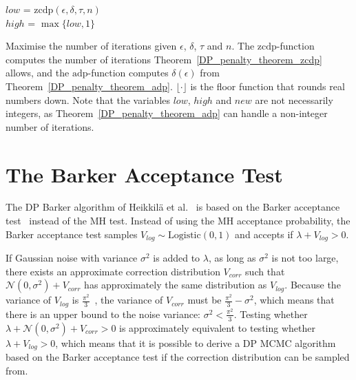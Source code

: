 \documentclass[english,twoside,openright]{HYgraduMLDS}
\newcommand{\caln}{{\mathcal{N}}}
\begin{document}
\begin{algorithm}[H]\label{max_iterations_algo}
  \SetAlgoLined
	\(low\) = \(\mathrm{zcdp}(\epsilon, \delta, \tau, n)\) \\
  \(high\) = \(\max \{low, 1\}\) \\


  \caption{
    Maximise the number of iterations given \(\epsilon\), \(\delta\),
    \(\tau\) and \(n\). The
    \(\mathrm{zcdp}\)-function computes the number of iterations
    Theorem~\ref{DP_penalty_theorem_zcdp} allows, and the
    \(\mathrm{adp}\)-function computes \(\delta(\epsilon)\) from
    Theorem~\ref{DP_penalty_theorem_adp}. \(\lfloor \cdot \rfloor\) is the
    floor function that rounds real numbers down. Note that the variables
    \(low\), \(high\) and \(new\) are not necessarily integers, as
    Theorem~\ref{DP_penalty_theorem_adp} can handle a non-integer number of
    iterations.
  }
\end{algorithm}

\section{The Barker Acceptance Test}\label{dp_barker_section}

The DP Barker algorithm of Heikkilä et al.~\cite{HeikkilaJDH19} is based on
the Barker acceptance test~\cite{Barker65} instead of the MH test.
Instead of using the MH acceptance probability, the Barker acceptance test samples 
\(V_{log}\sim \mathrm{Logistic(0, 1)}\) and accepts if \(\lambda + V_{log} > 0\).

If Gaussian noise with variance \(\sigma^2\) is added to 
\(\lambda\), as long as \(\sigma^{2}\) is not too large, there exists an
approximate correction
distribution \(V_{corr}\) such that \(\caln(0, \sigma^2) + V_{corr}\) has
approximately the same distribution as \(V_{log}\). Because the variance of
\(V_{log}\) is
\(\frac{\pi^2}{3}\)~\cite{HeikkilaJDH19}, the variance of \(V_{corr}\) must be 
\(\frac{\pi^2}{3} - \sigma^2\), which means that there is an upper bound
to the noise variance: \(\sigma^2 < \frac{\pi^2}{3}\). Testing whether 
\(\lambda + \caln(0, \sigma^2) + V_{corr} > 0\) is approximately equivalent
to testing 
whether \(\lambda + V_{log} > 0\), which means that it is possible to derive 
a DP MCMC algorithm based on the Barker acceptance test if the correction 
distribution can be sampled from.
\end{document}

